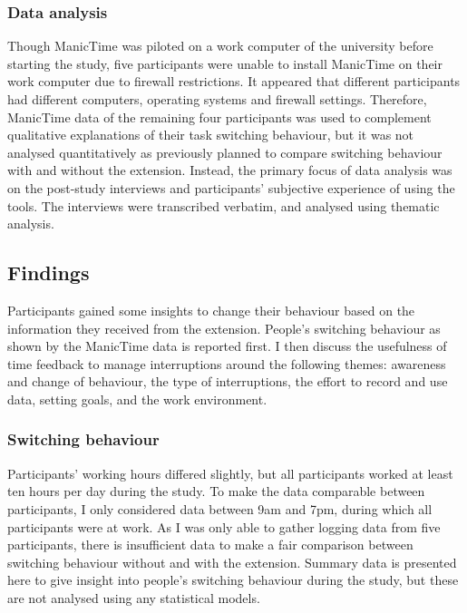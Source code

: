 \subsubsection{Data analysis}
Though ManicTime was piloted on a work computer of the university before starting the study, five participants were unable to install ManicTime on their work computer due to firewall restrictions. It appeared that different participants had different computers, operating systems and firewall settings. %
Therefore, ManicTime data of the remaining four participants was used to complement qualitative explanations of their task switching behaviour, but it was not analysed quantitatively as previously planned to compare switching behaviour with and without the extension. Instead, the primary focus of data analysis was on the post-study interviews and participants' subjective experience of using the tools. The interviews were transcribed verbatim, and analysed using thematic analysis.

\subsection{Findings}
Participants gained some insights to change their behaviour based on the information they received from the extension. People’s switching behaviour as shown by the ManicTime data is reported first. I then discuss the usefulness of time feedback to manage interruptions around the following themes: awareness and change of behaviour, the type of interruptions, the effort to record and use data, setting goals, and the work environment.

\subsubsection{Switching behaviour}
Participants’ working hours differed slightly, but all participants worked at least ten hours per day during the study. To make the data comparable between participants, I only considered data between 9am and 7pm, during which all participants were at work. As I was only able to gather logging data from five participants, there is insufficient data to make a fair comparison between switching behaviour without and with the extension. Summary data is presented here to give insight into people's switching behaviour during the study, but these are not analysed using any statistical models.

